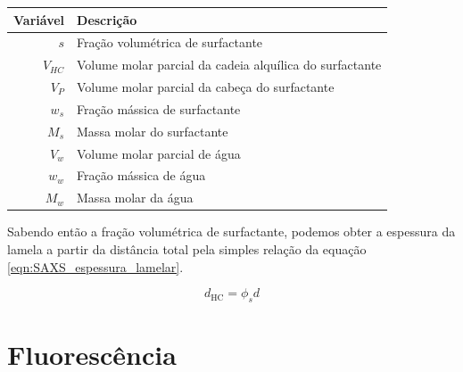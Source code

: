 		\begin{table}[H]
			{\begin{tabular}{r l}
				\toprule
				           Variável & Descrição                                               \\ \midrule
				              \(s\) & Fração volumétrica de surfactante                       \\
				\(V_{\textit{HC}}\) & Volume molar parcial da cadeia alquílica do surfactante \\
				          \(V_{P}\) & Volume molar parcial da cabeça do surfactante           \\
				          \(w_{s}\) & Fração mássica de surfactante                           \\
				          \(M_{s}\) & Massa molar do surfactante                              \\ \midrule
				          \(V_{w}\) & Volume molar parcial de água                            \\
				          \(w_{w}\) & Fração mássica de água                                  \\
				          \(M_{w}\) & Massa molar da água                                     \\ \bottomrule
			\end{tabular}
			}%
			{}%
		\end{table}
		
		Sabendo então a fração volumétrica de surfactante, podemos obter a espessura da lamela a partir da distância total pela simples relação da equação \ref{eqn:SAXS_espessura_lamelar}.
		
		\begin{equation} \label{eqn:SAXS_espessura_lamelar}
			d_{\text{HC}} = \phi_s d
		\end{equation}
		
		
		
	\chapter{Fluorescência}
